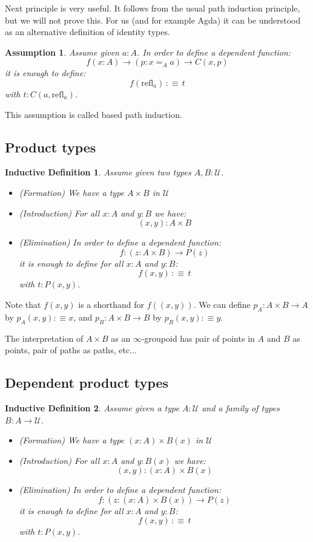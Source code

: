 \documentclass{article}
\newcommand{\sse}[1]{\medbreak \subsection{#1}}
\newcommand{\U}{{\mathcal U}}
\renewcommand{\r}{\rightarrow}
\newcommand{\refl}{\mathrm{refl}}
\newtheorem{remark}{Remark}
\newtheorem{ind_def}{Inductive Definition}
\newtheorem{assumption}{Assumption}
\begin{document}
Next principle is very useful. It follows from the usual path induction principle, but we will not prove this. For us (and for example Agda) it can be understood as an alternative definition of identity types. %

\begin{assumption}
Assume given $a:A$. In order to define a dependent function:
\[f(x:A)\r (p:x=_Aa)\r C(x,p)\]
it is enough to define:
\[f(\refl_a) \, :\equiv\, t\]
with $t:C(a,\refl_a)$.
\end{assumption}

This assumption is called based path induction.










\sse{Product types}

\begin{ind_def}
Assume given two types $A,B:\U$.
\begin{itemize}
\item (Formation) We have a type $A\times B$ in $\U$
\item (Introduction) For all $x:A$ and $y:B$ we have:
\[(x,y) : A\times B\]
\item (Elimination) In order to define a dependent function: 
\[f : (z:A\times B)\r P(z)\] 
it is enough to define for all $x:A$ and $y:B$:
\[f(x,y)\, :\equiv\, t\]
with $t:P(x,y)$.
\end{itemize}
\end{ind_def}

Note that $f(x,y)$ is a shorthand for $f((x,y))$. We can define $p_A : A\times B\r A$ by $p_A(x,y) :\equiv x$, and $p_B : A\times B \r B$ by $p_B(x,y) :\equiv y$. %

The interpretation of $A\times B$ as an $\infty$-groupoid has pair of points in $A$ and $B$ as points, pair of paths as paths, etc...


\sse{Dependent product types}

\begin{ind_def}
Assume given a type $A:\U$ and a family of types $B:A\r \U$.
\begin{itemize}
\item (Formation) We have a type $(x:A)\times B(x)$ in $\U$
\item (Introduction) For all $x:A$ and $y:B(x)$ we have:
\[(x,y) : (x:A)\times B(x)\]
\item (Elimination) In order to define a dependent function: 
\[f : (z:(x:A)\times B(x))\r P(z)\] 
it is enough to define for all $x:A$ and $y:B$:
\[f(x,y)\, :\equiv\, t\]
with $t:P(x,y)$.
\end{itemize}
\end{ind_def}
\end{document}
